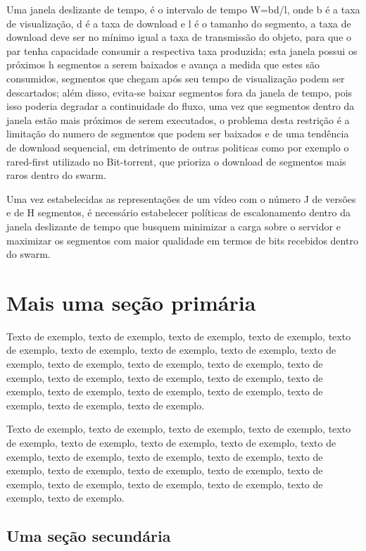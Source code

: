 \documentclass[
	12pt,				%
	oneside,			%
	a4paper,			%
	english,			%
	brazil				%
	]{abntex2ppgsi}
\begin{document}
Uma janela deslizante de tempo, é o intervalo de tempo W=bd/l, onde b é a taxa de visualização, d é a taxa de download e l é o tamanho do segmento, a taxa de download deve ser no mínimo igual a taxa de transmissão do objeto, para que o par tenha capacidade consumir a respectiva taxa produzida; esta janela possui os próximos h segmentos a serem baixados e avança a medida que estes são consumidos, segmentos que chegam após seu tempo de visualização podem ser descartados; além disso, evita-se baixar segmentos fora da janela de tempo, pois isso poderia degradar a continuidade do fluxo, uma vez que segmentos dentro da janela estão mais próximos de serem executados,  o problema desta restrição é a limitação do numero de segmentos que podem ser baixados e de uma tendência de download sequencial, em detrimento de outras politicas como por exemplo o rared-first utilizado no Bit-torrent, que prioriza o download de segmentos mais raros dentro do swarm.

Uma vez estabelecidas as representações de um vídeo com o número J de versões e de H segmentos, é necessário estabelecer políticas de escalonamento dentro da janela deslizante de tempo que busquem minimizar a carga sobre o servidor e maximizar os segmentos com maior qualidade em termos de bits recebidos dentro do swarm.



\chapter{Mais uma seção primária}

Texto de exemplo, texto de exemplo, texto de exemplo, texto de exemplo, texto de exemplo, texto de exemplo, texto de exemplo, texto de exemplo, texto de exemplo, texto de exemplo, texto de exemplo, texto de exemplo, texto de exemplo, texto de exemplo, texto de exemplo, texto de exemplo, texto de exemplo, texto de exemplo, texto de exemplo, texto de exemplo, texto de exemplo, texto de exemplo, texto de exemplo.

Texto de exemplo, texto de exemplo, texto de exemplo, texto de exemplo, texto de exemplo, texto de exemplo, texto de exemplo, texto de exemplo, texto de exemplo, texto de exemplo, texto de exemplo, texto de exemplo, texto de exemplo, texto de exemplo, texto de exemplo, texto de exemplo, texto de exemplo, texto de exemplo, texto de exemplo, texto de exemplo, texto de exemplo, texto de exemplo.

\section{Uma seção secundária}
\end{document}

